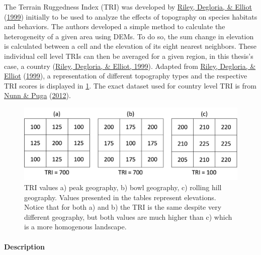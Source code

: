 \documentclass[12pt,twoside]{reedthesis}
\begin{document}
The Terrain Ruggedness Index (TRI) was developed by \protect\hyperlink{ref-rileyTerrainRuggednessIndex1999}{Riley, Degloria, \& Elliot} (\protect\hyperlink{ref-rileyTerrainRuggednessIndex1999}{1999}) initially to be used to analyze the effects of topography on species habitats and behaviors. The authors developed a simple method to calculate the heterogeneity of a given area using DEMs. To do so, the sum change in elevation is calculated between a cell and the elevation of its eight nearest neighbors. These individual cell level TRIs can then be averaged for a given region, in this thesis's case, a country (\protect\hyperlink{ref-rileyTerrainRuggednessIndex1999}{Riley, Degloria, \& Elliot, 1999}). Adapted from \protect\hyperlink{ref-rileyTerrainRuggednessIndex1999}{Riley, Degloria, \& Elliot} (\protect\hyperlink{ref-rileyTerrainRuggednessIndex1999}{1999}), a representation of different topography types and the respective TRI scores is displayed in \ref{fig:tricalc}. The exact dataset used for country level TRI is from \protect\hyperlink{ref-nunnRuggednessBlessingBad2012}{Nunn \& Puga} (\protect\hyperlink{ref-nunnRuggednessBlessingBad2012}{2012}).
\begin{figure}

{\centering \includegraphics[width=0.75\linewidth]{figure/TRI_calc} 

}

\caption[Example calculations of Terrain Ruggedness Index (TRI) for differing geographies.]{TRI values a) peak geography, b) bowl geography, c) rolling hill geography. Values presented in the tables represent elevations. Notice that for both a) and b) the TRI is the same despite very different geography, but both values are much higher than c) which is a more homogenous landscape.}\label{fig:tricalc}
\end{figure}
\hypertarget{ruggeddesc}{%
\paragraph{Description}\label{ruggeddesc}}
\end{document}
